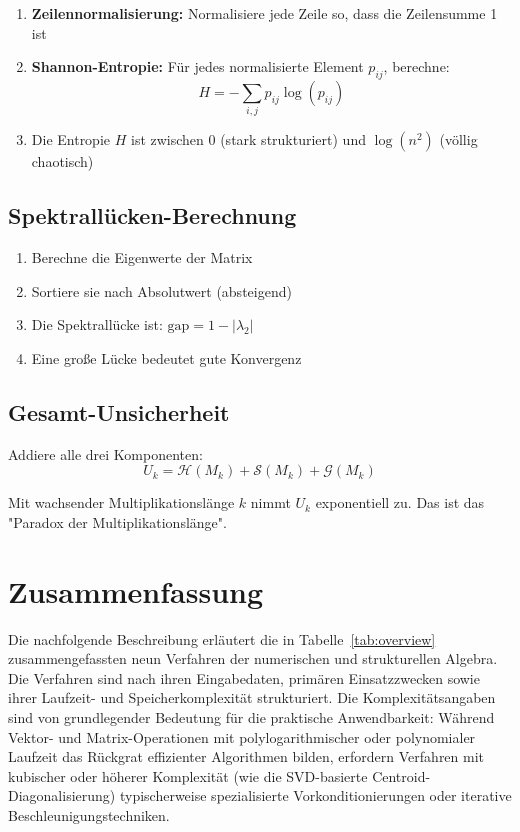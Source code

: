 \documentclass[a4paper,12pt]{article}
\begin{document}
\begin{enumerate}
\item \textbf{Zeilennormalisierung:} Normalisiere jede Zeile so, dass die Zeilensumme 1 ist

\item \textbf{Shannon-Entropie:} Für jedes normalisierte Element $p_{ij}$, berechne:
$$H = -\sum_{i,j} p_{ij} \log(p_{ij})$$

\item Die Entropie $H$ ist zwischen 0 (stark strukturiert) und $\log(n^2)$ (völlig chaotisch)
\end{enumerate}

\subsection{Spektrallücken-Berechnung}

\begin{enumerate}
\item Berechne die Eigenwerte der Matrix

\item Sortiere sie nach Absolutwert (absteigend)

\item Die Spektrallücke ist: $\text{gap} = 1 - |\lambda_2|$

\item Eine große Lücke bedeutet gute Konvergenz
\end{enumerate}

\subsection{Gesamt-Unsicherheit}

Addiere alle drei Komponenten:
$$U_k = \mathcal{H}(M_k) + \mathcal{S}(M_k) + \mathcal{G}(M_k)$$

Mit wachsender Multiplikationslänge $k$ nimmt $U_k$ exponentiell zu. Das ist das "Paradox der Multiplikationslänge".

\section{Zusammenfassung}
Die nachfolgende Beschreibung erläutert die in Tabelle~\ref{tab:overview} zusammengefassten neun Verfahren der numerischen und strukturellen Algebra. Die Verfahren sind nach ihren Eingabedaten, primären Einsatzzwecken sowie ihrer Laufzeit- und Speicherkomplexität strukturiert. Die Komplexitätsangaben sind von grundlegender Bedeutung für die praktische Anwendbarkeit: Während Vektor- und Matrix-Operationen mit polylogarithmischer oder polynomialer Laufzeit das Rückgrat effizienter Algorithmen bilden, erfordern Verfahren mit kubischer oder höherer Komplexität (wie die SVD-basierte Centroid-Diagonalisierung) typischerweise spezialisierte Vorkonditionierungen oder iterative Beschleunigungstechniken.
\end{document}
